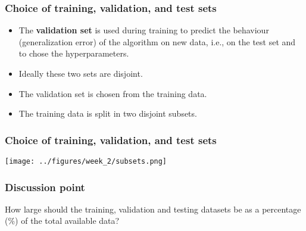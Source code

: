 \documentclass[notes]{beamer}          %
\newif\iffull
\begin{document}
\begin{frame}
\frametitle{Choice of training, validation, and test sets}
    \begin{itemize}
        \item The {\bf validation set} is used during training to predict the behaviour (generalization error) of the algorithm on new data, i.e., on the {test set} and to chose the hyperparameters.
        \item Ideally these two sets are disjoint.
        \item The validation set is chosen from the training data.
        \item The training data is split in two disjoint subsets.
        \iffull
        \item One subset is used to learn the parameters of the algorithm and the other is the validation set.
        \item The subset used to learn the parameters is still typically called a {\bf training set}.
        \fi
    \end{itemize}
\end{frame}

\iffull
\begin{frame}
\frametitle{Choice of training, validation, and test sets}
    \begin{itemize}
        \item Since the validation set is used to determine the hyperparameters it will typically underestimate the generalization error.
        \item However, it will usually better predict the generalization error than the training set.
        \item After the completion of the hyperparameters optimization we can estimate the generalization error using the test data.
        \item In practice the testing should be done also on different test data to avoid the test data becoming ``stale''.
    \end{itemize}
\end{frame}
\fi

\begin{frame}
\frametitle{Choice of training, validation, and test sets}
    \begin{center}
        \texttt{[image: ../figures/week\_2/subsets.png]}
    \end{center}
\end{frame}


\begin{frame}
\frametitle{Discussion point}
How large should the training, validation and testing datasets be as a percentage (\%) of the total available data?
\end{frame}
\end{document}
